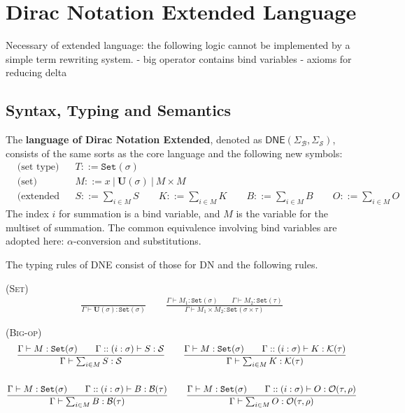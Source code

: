 
\section{Dirac Notation Extended Language}

Necessary of extended language: the following logic cannot be implemented by a simple term rewriting system.
- big operator contains bind variables
- axioms for reducing delta

\subsection{Syntax, Typing and Semantics}
\begin{definition}[DNE]
    The \textbf{language of Dirac Notation Extended}, denoted as $\textsf{DNE}(\Sigma_\mathcal{B}, \Sigma_\mathcal{S})$, consists of the same sorts as the core language and the following new symbols:
    \begin{align*}
        & \text{(set type)} && T ::= \texttt{Set}(\sigma) \\
        & \text{(set)} && M ::= x\ |\ \mathbf{U}(\sigma)\ |\ M \times M \\
        & \text{(extended Dirac notation)} && S ::= \sum_{i \in M} S
        \qquad K ::= \sum_{i \in M} K
        \qquad B ::= \sum_{i \in M} B
        \qquad O ::= \sum_{i \in M} O
    \end{align*}
    The index $i$ for summation is a bind variable, and $M$ is the variable for the multiset of summation. The common equivalence involving bind variables are adopted here: $\alpha$-conversion and substitutions.
\end{definition}



The typing rules of DNE consist of those for DN and the following rules.

\textsc{(Set)}
\begin{gather*}
  \frac{}{\Gamma \vdash \mathbf{U}(\sigma) : \texttt{Set}(\sigma)}
  \qquad
  \frac{\Gamma \vdash M_1 : \texttt{Set}(\sigma) \qquad \Gamma \vdash M_2 : \texttt{Set}(\tau)}{\Gamma \vdash M_1 \times M_2 : \texttt{Set}(\sigma \times \tau)}
\end{gather*}

\textsc{(Big-op)}
\begin{gather*}
  \frac{\Gamma \vdash M : \texttt{Set}(\sigma) \qquad \Gamma::(i : \sigma) \vdash S : \mathcal{S}}{\Gamma \vdash \sum_{i \in M} S : \mathcal{S}}
  \qquad
  \frac{\Gamma \vdash M : \texttt{Set}(\sigma) \qquad \Gamma::(i : \sigma) \vdash K : \mathcal{K}(\tau)}{\Gamma \vdash \sum_{i \in M} K : \mathcal{K}(\tau)} \\
  \\
  \frac{\Gamma \vdash M : \texttt{Set}(\sigma) \qquad \Gamma::(i : \sigma) \vdash B : \mathcal{B}(\tau)}{\Gamma \vdash \sum_{i \in M} B : \mathcal{B}(\tau)}
  \qquad
  \frac{\Gamma \vdash M : \texttt{Set}(\sigma) \qquad \Gamma::(i : \sigma) \vdash O : \mathcal{O}(\tau, \rho)}{\Gamma \vdash \sum_{i \in M} O : \mathcal{O}(\tau, \rho)}
\end{gather*}

